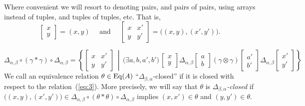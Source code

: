 Where convenient we will resort to denoting pairs, and pairs of pairs, using arrays instead of tuples, and tuples of tuples, etc. That is, 
\[
\begin{bmatrix} x \\ y \end{bmatrix} = (x,y) \quad
\text{ and } \quad 
\begin{bmatrix} x & x'\\y & y' \end{bmatrix} = \bigl((x,y), (x', y')\bigr).
\]


\begin{equation}
  \label{eq:3}
  \Delta_{\alpha, \beta} \circ (\gamma \ast \gamma) \circ \Delta_{\alpha, \beta} =
  \left\{
  \begin{bmatrix} x & x'\\y & y' \end{bmatrix}
  \,\middle|\,
  \bigl(\exists a, b, a', b'\bigr) \,
  \begin{bmatrix} x\\y \end{bmatrix}
  \mathrel{\Delta_{\alpha, \beta}}
  \begin{bmatrix} a\\b \end{bmatrix}
  \mathrel{(\gamma\otimes \gamma)}
  \begin{bmatrix} a'\\b' \end{bmatrix}
  \mathrel{\Delta_{\alpha, \beta}}
  \begin{bmatrix} x'\\y' \end{bmatrix}\right\}
\end{equation}
We call an equivalence relation $\theta\in \operatorname{Eq}(A)$ ``$\Delta_{\beta,\alpha}$-closed'' if
it is closed with respect to the relation~(\ref{eq:3}).
More precisely, we will say that $\theta$ is \emph{$\Delta_{\beta,\alpha}$-closed} if
$\bigl((x,y),(x',y')\bigr) \in \Delta_{\alpha, \beta} \circ (\theta\ast \theta)
\circ \Delta_{\alpha, \beta}$
implies $(x,x') \in \theta$ and $(y,y') \in \theta$.

